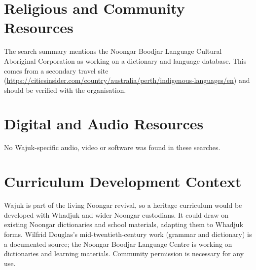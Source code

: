 \documentclass[12pt]{article}
\begin{document}
\section{Religious and Community Resources}
The search summary mentions the Noongar Boodjar Language Cultural Aboriginal Corporation as working on a dictionary and language database. This comes from a secondary travel site (\url{https://citiesinsider.com/country/australia/perth/indigenous-languages/en}) and should be verified with the organisation.

\section{Digital and Audio Resources}
No Wajuk-specific audio, video or software was found in these searches.

\section{Curriculum Development Context}
Wajuk is part of the living Noongar revival, so a heritage curriculum would be developed with Whadjuk and wider Noongar custodians. It could draw on existing Noongar dictionaries and school materials, adapting them to Whadjuk forms. Wilfrid Douglas's mid-twentieth-century work (grammar and dictionary) is a documented source; the Noongar Boodjar Language Centre is working on dictionaries and learning materials. Community permission is necessary for any use.
\end{document}
